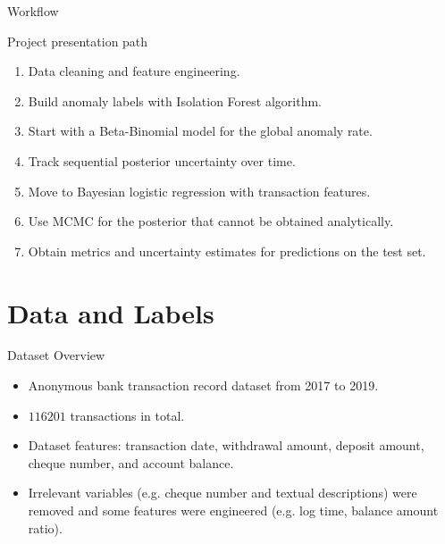 \documentclass[aspectratio=169,11pt]{beamer}
\begin{document}
\begin{frame}{Workflow}
  \begin{block}{Project presentation path}
  \begin{enumerate}
    \item Data cleaning and feature engineering.
    \item Build anomaly labels with Isolation Forest algorithm.
    \item Start with a Beta-Binomial model for the global anomaly rate.
    \item Track sequential posterior uncertainty over time.
    \item Move to Bayesian logistic regression with transaction features.
    \item Use MCMC for the posterior that cannot be obtained analytically.
    \item Obtain metrics and uncertainty estimates for predictions on the test set.
  \end{enumerate}
  \end{block}
\end{frame}

\section{Data and Labels}

\begin{frame}{Dataset Overview}
      \begin{itemize}
        \item Anonymous bank transaction record dataset from 2017 to 2019.
        \item $116201$ transactions in total.
        \item Dataset features: transaction date, withdrawal amount, deposit amount, cheque number, and account balance.
        \item Irrelevant variables (e.g. cheque number and textual descriptions) were removed and some features were engineered (e.g. log time, balance amount ratio).
      \end{itemize}
\end{frame}
\end{document}
